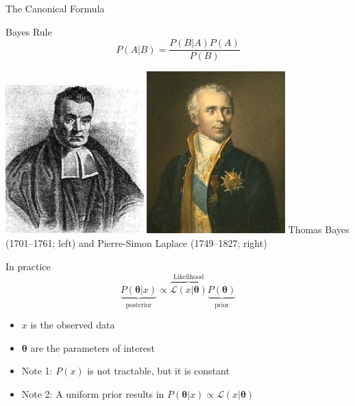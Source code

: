 \documentclass[
  ignorenonframetext,
]{beamer}
\providecommand{\tightlist}{%
  \setlength{\itemsep}{0pt}\setlength{\parskip}{0pt}}
\begin{document}
\begin{frame}{The Canonical Formula}
\protect\hypertarget{the-canonical-formula}{}
\begin{block}{Bayes Rule}
$$ P(A|B) = \frac{P(B|A)P(A)}{P(B)} $$
\end{block}

\centering

\includegraphics[width=0.4\textwidth,height=0.4\textheight]{Thomas_Bayes3.jpg}
\includegraphics[width=0.4\textwidth,height=0.4\textheight]{Laplace.jpg}
\newline\tiny Thomas Bayes (1701--1761; left) and Pierre-Simon Laplace
(1749--1827; right)
\end{frame}

\begin{frame}{In practice}
\protect\hypertarget{in-practice}{}
\[\underbrace{P(\boldsymbol{\theta}|x)}_{\text{posterior}}\propto \overbrace{\mathcal{L}(x|\boldsymbol{\theta})}^{\text{Likelihood}}\underbrace{P(\boldsymbol{\theta})}_{\text{prior}}\]

\begin{itemize}
\tightlist
\item
  \(x\) is the observed data
\item
  \(\boldsymbol{\theta}\) are the parameters of interest
\item
  Note 1: \(P(x)\) is not tractable, but it is constant
\item
  Note 2: A uniform prior results in
  \(P(\boldsymbol{\theta}|x)\propto \mathcal{L}(x|\boldsymbol{\theta})\)
\end{itemize}
\end{frame}
\end{document}
